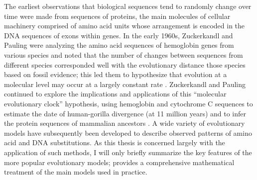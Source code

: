 The earliest observations that biological sequences tend to randomly
change over time were made from sequences of proteins, the main
molecules of cellular machinery comprised of amino acid units whose
arrangement is encoded in the DNA sequences of exons within genes. In
the early 1960s, Zuckerkandl and Pauling were analyzing the amino acid
sequences of hemoglobin genes from various species and noted that the
number of changes between sequences from different species
corresponded well with the evolutionary distance those species based
on fossil evidence; this led them to hypothesize that evolution at a
molecular level may occur at a largely constant rate
\citep{Zuckerkandl1962,Morgan1998}. Zuckerkandl and Pauling continued
to explore the implications and applications of this ``molecular
evolutionary clock'' hypothesis, using hemoglobin and cytochrome C
sequences to estimate the date of human-gorilla divergence (at 11
million years) and to infer the protein sequences of mammalian
ancestors \citep{Zuckerkandl1965}. A wide variety of evolutionary
models have subsequently been developed to describe observed patterns
of amino acid and DNA substitutions. As this thesis is concerned
largely with the application of such methods, I will only briefly
summarize the key features of the more popular evolutionary models;
\citet{Yang2006} provides a comprehensive mathematical treatment of
the main models used in practice.

